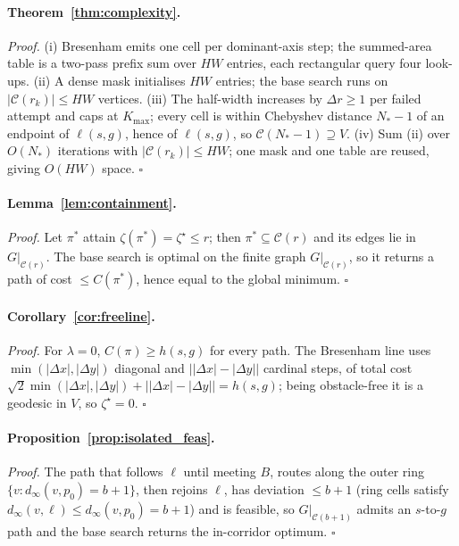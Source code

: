 \documentclass[11pt]{article}
\begin{document}
\paragraph{Theorem~\ref{thm:complexity}.}
\noindent\textit{Proof.}
(i) Bresenham emits one cell per dominant-axis step; the summed-area table is a two-pass prefix sum over $HW$ entries, each rectangular query four look-ups. (ii) A dense mask initialises $HW$ entries; the base search runs on $|\mathcal{C}(r_k)| \leq HW$ vertices. (iii) The half-width increases by $\Delta r \geq 1$ per failed attempt and caps at $K_{\max}$; every cell is within Chebyshev distance $N_{\!*}-1$ of an endpoint of $\ell(s,g)$, hence of $\ell(s,g)$, so $\mathcal{C}(N_{\!*}-1) \supseteq V$. (iv) Sum (ii) over $O(N_{\!*})$ iterations with $|\mathcal{C}(r_k)| \leq HW$; one mask and one table are reused, giving $O(HW)$ space. $\square$

\paragraph{Lemma~\ref{lem:containment}.}
\noindent\textit{Proof.}
Let $\pi^*$ attain $\zeta(\pi^*) = \zeta^\star \leq r$; then $\pi^* \subseteq \mathcal{C}(r)$ and its edges lie in $G|_{\mathcal{C}(r)}$. The base search is optimal on the finite graph $G|_{\mathcal{C}(r)}$, so it returns a path of cost $\leq C(\pi^*)$, hence equal to the global minimum. $\square$

\paragraph{Corollary~\ref{cor:freeline}.}
\noindent\textit{Proof.}
For $\lambda = 0$, $C(\pi) \geq h(s,g)$ for every path. The Bresenham line uses $\min(|\Delta x|,|\Delta y|)$ diagonal and $\bigl||\Delta x|-|\Delta y|\bigr|$ cardinal steps, of total cost $\sqrt2 \min(|\Delta x|,|\Delta y|) + \bigl||\Delta x|-|\Delta y|\bigr| = h(s,g)$; being obstacle-free it is a geodesic in $V$, so $\zeta^\star = 0$. $\square$

\paragraph{Proposition~\ref{prop:isolated_feas}.}
\noindent\textit{Proof.}
The path that follows $\ell$ until meeting $B$, routes along the outer ring $\{v: d_\infty(v,p_0) = b+1\}$, then rejoins $\ell$, has deviation $\leq b+1$ (ring cells satisfy $d_\infty(v,\ell) \leq d_\infty(v,p_0) = b+1$) and is feasible, so $G|_{\mathcal{C}(b+1)}$ admits an $s$-to-$g$ path and the base search returns the in-corridor optimum. $\square$
\end{document}
